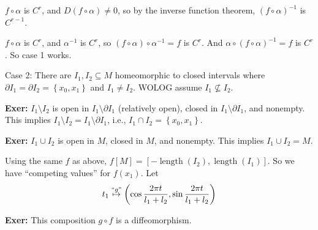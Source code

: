 \documentclass[10pt,letterpaper]{article}
\newcommand{\n}{\hfill\break}
\newcommand{\exer}[1]{\par\noindent\settowidth{\hangindent}{\textbf{Exer: }}\textbf{Exer: }#1\n}
\newcommand{\ptxt}[1]{\textrm{\textnormal{#1}}}
\newcommand{\set}[1]{\left\{#1\right\}}
\newcommand{\inv}{^{-1}}
\newcommand{\of}{\circ}
\DeclareMathOperator{\length}{length}
\newcommand{\paren}[1]{\left(#1\right)}
\begin{document}
\par\noindent $f\of\alpha$ is $C^{r}$, and $D(f\of\alpha)\ne{}0$, so by the inverse function theorem, $(f\of\alpha)\inv$ is $C^{r-1}$.\n

\par\noindent $f\of\alpha$ is $C^{r}$, and $\alpha\inv$ is $C^{r}$, so $(f\of\alpha)\of\alpha\inv=f$ is $C^{r}$. And $\alpha\of(f\of\alpha)\inv=f$ is $C^{r}$. So case 1 works.\n

\par\noindent Case 2: There are $I_{1},I_{2}\subseteq{}M$ homeomorphic to closed intervals where $\partial{}I_{1}=\partial{}I_{2}=\set{x_{0},x_{1}}$ and $I_{1}\ne{}I_{2}$.\n
WOLOG assume $I_{1}\not\subseteq{}I_{2}$.\n

\exer{$I_{1}\setminus{}I_{2}$ is open in $I_{1}\setminus\partial{}I_{1}$ (relatively open), closed in $I_{1}\setminus\partial{}I_{1}$, and nonempty.\n
This implies $I_{1}\setminus{}I_{2}=I_{1}\setminus\partial{}I_{1}$, i.e., $I_{1}\cap{}I_{2}=\set{x_{0},x_{1}}$.}

\exer{$I_{1}\cup{}I_{2}$ is open in $M$, closed in $M$, and nonempty.\n
This implies $I_{1}\cup{}I_{2}=M$.}

\par\noindent Using the same $f$ as above, $f[M]=[-\length(I_{2}),\length(I_{1})]$. So we have ``competing values'' for $f(x_{1})$. Let
\[
t_{1}\overset{\ptxt{``$g$''}}{\mapsto}\paren{\cos\frac{2\pi{}t}{l_{1}+l_{2}},\sin\frac{2\pi{}t}{l_{1}+l_{2}}}
\]

\exer{This composition $g\of{}f$ is a diffeomorphism.}
\end{document}
